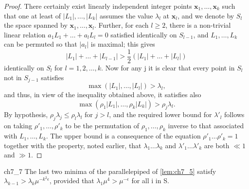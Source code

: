 \begin{proof}
There certainly exist linearly independent integer points  $\mathbf{x}_1, \ldots, \mathbf{x}_k$  such that one at least of  $|L_1|, \ldots, |L_k|$  assumes the value  $\lambda_l$  at  $\mathbf{x}_l$, and we denote by  $S_l$  the space spanned by  $\mathbf{x}_1, \ldots, \mathbf{x}_l$. Further, for each  $l \geq 2$, there is a non-trivial linear relation  $a_1 L_1 + \ldots + a_l L_l = 0$  satisfied identically on  $S_{l-1}$, and  $L_1, \dots, L_k$  can be permuted so that  $|a_l|$  is maximal; this gives
\[|L_1| + \ldots + |L_{l-1}| > \frac{1}{2}(|L_1| + \ldots + |L_l|)\]
identically on $S_l$ for $l = 1, 2, \dots, k$. Now for any j it is clear that every point in $S_l$ not in $S_{j-1}$ satisfies
\[\max (|L_1|, \dots, |L_l|) > \lambda_l,\]
and thus, in view of the inequality obtained above, it satisfies also
\[\max (\rho_1 |L_1|, \dots, \rho_k |L_k|) > \rho_j \lambda_l.\]
By hypothesis, $\rho_j \lambda_j \le \rho_l \lambda_l$ for $j > l$, and the required lower bound for $\lambda'_l$ follows on taking $\rho'_1, \dots, \rho'_k$ to be the permutation of $\rho_1, \dots, \rho_k$ inverse to that associated with $L_1, \dots, L_k$. The upper bound is a consequence of the equation $\rho'_1 \dots \rho'_k = 1$ together with the property, noted earlier, that $\lambda_1 \dots \lambda_k$ and $\lambda'_1 \dots \lambda'_k$ are both $\ll 1$ and $\gg 1$.
\end{proof}

\begin{mylemma}{}{ch7_7}
The last two minima of the parallelepiped of \autoref{lem:ch7_5} satisfy $\lambda_{k-1} > \lambda_k \mu^{-k^2\epsilon}$, provided that $\lambda_1 \mu^4 > \mu^{-\epsilon}$ for all i in S.
\end{mylemma}


